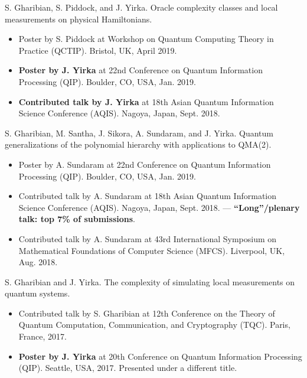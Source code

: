 \documentclass[11pt,letterpaper,serif]{moderncv}
\newcommand{\pubItemSep}{0.3em}
\begin{document}
S. Gharibian, S. Piddock, and J. Yirka. Oracle complexity classes and local measurements on physical Hamiltonians.
\begin{adjustwidth}{.25in}{}
	\begin{itemize}[itemsep=\pubItemSep]
		\item Poster by S. Piddock at Workshop on Quantum Computing Theory in Practice (QCTIP). Bristol, UK, April 2019.
		\item \textbf{Poster by J. Yirka} at 22nd Conference on Quantum Information Processing (QIP). Boulder, CO, USA, Jan. 2019.
		\item \textbf{Contributed talk by J. Yirka} at 18th Asian Quantum Information Science Conference (AQIS). Nagoya, Japan, Sept. 2018.
	\end{itemize}
\end{adjustwidth}

S. Gharibian, M. Santha, J. Sikora, A. Sundaram, and J. Yirka. Quantum generalizations of the polynomial hierarchy with applications to QMA(2).
\begin{adjustwidth}{.25in}{} 
	\begin{itemize}[itemsep=\pubItemSep]
		\item Poster by A. Sundaram at 22nd Conference on Quantum Information Processing (QIP). Boulder, CO, USA, Jan. 2019.
		\item Contributed talk by A. Sundaram at 18th Asian Quantum Information Science Conference (AQIS). Nagoya, Japan, Sept. 2018. --- \textbf{``Long''/plenary talk: top 7\% of submissions}.
		\item Contributed talk by A. Sundaram at 43rd International	Symposium on Mathematical Foundations of Computer Science (MFCS). Liverpool, UK, Aug. 2018.
	\end{itemize}
\end{adjustwidth}

S. Gharibian and J. Yirka. The complexity of simulating local measurements on quantum systems.
\begin{adjustwidth}{.25in}{}
	\begin{itemize}[itemsep=\pubItemSep]
		\item Contributed talk by S. Gharibian at 12th Conference on the Theory of Quantum Computation, Communication,
		and Cryptography (TQC). Paris, France, 2017.
		\item \textbf{Poster by J. Yirka} at 20th Conference on Quantum Information Processing (QIP). Seattle, USA, 2017. Presented under a different title.
	\end{itemize}
\end{adjustwidth}
\end{document}
